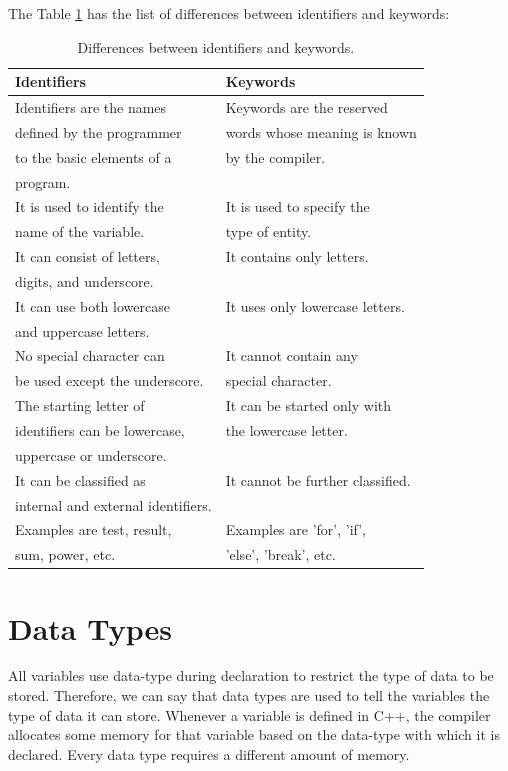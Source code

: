\documentclass{book}
\begin{document}
The Table \ref{identifiersandkeywords} has the list of differences between identifiers and keywords:

\begin{table}[h]
\centering 
\begin{tabular}{ll} \hline 
Identifiers	& Keywords \\ \hline 
Identifiers are the names  &	Keywords are the reserved  \\
defined by the programmer  & words whose meaning is known \\ 
to the basic elements of a &  by the compiler. \\
program.										& \\ \hline 
It is used to identify the 	& It is used to specify the  \\ 
name of the variable. &  type of entity. \\ \hline 
It can consist of letters, 	& It contains only letters. \\ 
digits, and underscore. & \\ \hline 
It can use both lowercase & It uses only lowercase letters. \\ 
and uppercase letters. & \\ \hline 
No special character can 	& It cannot contain any  \\ 
be used except the underscore. & special character. \\ \hline
The starting letter of  & 	It can be started only with  \\
identifiers can be lowercase,  & the lowercase letter. \\ 
uppercase or underscore. & \\ \hline 
It can be classified as 	& It cannot be further classified. \\ 
internal and external identifiers. & \\ \hline 
Examples are test, result, 	& Examples are 'for', 'if',  \\  
sum, power, etc. & 'else', 'break', etc. \\ \hline
\end{tabular}
\caption{Differences between identifiers and keywords.}
\label{identifiersandkeywords}
\end{table}

\section{Data Types}

All variables use data-type during declaration to restrict the type of data to be stored. Therefore, we can say that data types are used to tell the variables the type of data it can store. Whenever a variable is defined in C++, the compiler allocates some memory for that variable based on the data-type with which it is declared. Every data type requires a different amount of memory.
\end{document}
